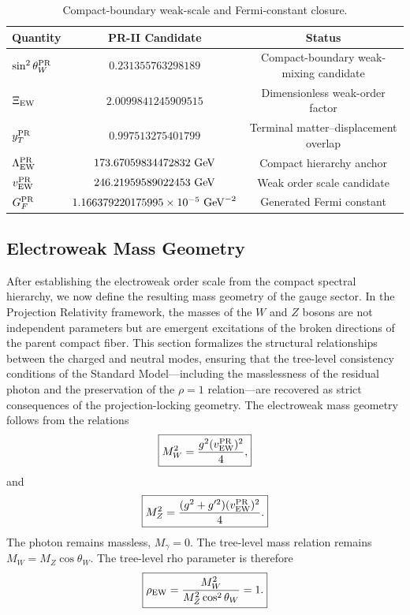 \documentclass[11pt]{article}
\renewcommand{\arraystretch}{1.22}
\renewcommand{\arraystretch}{1.4}
\begin{document}
\begin{table}[ht!]
\centering
\caption{Compact-boundary weak-scale and Fermi-constant closure.}
\label{tab:pr2_weak_scale_fermi_closure}
\small
\renewcommand{\arraystretch}{1.25}
\begin{tabular}{lcc}
\hline
\textbf{Quantity} & \textbf{PR-II Candidate} & \textbf{Status} \\ \hline
\(\sin^2\theta_W^{\rm PR}\) 
& \(0.231355763298189\) 
& Compact-boundary weak-mixing candidate \\

\(\Xi_{\rm EW}\) 
& \(2.0099841245909515\) 
& Dimensionless weak-order factor \\

\(y_T^{\rm PR}\) 
& \(0.997513275401799\) 
& Terminal matter--displacement overlap \\

\(\Lambda_{\rm EW}^{\rm PR}\) 
& \(173.67059834472832\ {\rm GeV}\) 
& Compact hierarchy anchor \\

\(v_{\rm EW}^{\rm PR}\) 
& \(246.21959589022453\ {\rm GeV}\) 
& Weak order scale candidate \\

\(G_F^{\rm PR}\) 
& \(1.166379220175995\times10^{-5}\ {\rm GeV}^{-2}\) 
& Generated Fermi constant \\ \hline
\end{tabular}
\end{table}

\subsection{Electroweak Mass Geometry}
\label{sec:pr2_electroweak_mass_geometry}
After establishing the electroweak order scale from the compact spectral hierarchy, we now define the resulting mass geometry of the gauge sector. In the Projection Relativity framework, the masses of the $W$ and $Z$ bosons are not independent parameters but are emergent excitations of the broken directions of the parent compact fiber. This section formalizes the structural relationships between the charged and neutral modes, ensuring that the tree-level consistency conditions of the Standard Model—including the masslessness of the residual photon and the preservation of the $\rho=1$ relation—are recovered as strict consequences of the projection-locking geometry. The electroweak mass geometry follows from the relations
\begin{equation}
\boxed{
M_W^2
=
\frac{g^2(v_{\rm EW}^{\rm PR})^2}{4},
}
\end{equation}
and
\begin{equation}
\boxed{
M_Z^2
=
\frac{
(g^2+g'^2)
(v_{\rm EW}^{\rm PR})^2
}{4}.
}
\end{equation}
The photon remains massless, $M_\gamma=0$. The tree-level mass relation remains $M_W = M_Z\cos\theta_W$. The tree-level rho parameter is therefore
\begin{equation}
\boxed{
\rho_{\rm EW}
=
\frac{
M_W^2
}{
M_Z^2\cos^2\theta_W
}
=
1.
}
\end{equation}
\end{document}
